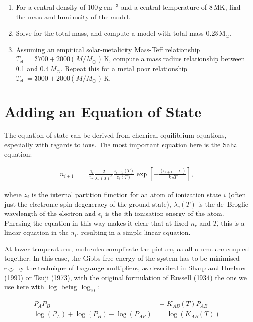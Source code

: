 \documentclass[12pt]{article}
\begin{document}
\begin{enumerate}
\item For a central density of 100\,g\,cm$^{-3}$ and a central temperature of 8\,MK, find the mass and luminosity of the model.

\item Solve for the total mass, and compute a model with total mass 0.28\,M$_\odot$.

\item Assuming an empirical solar-metalicity Mass-Teff relationship $T_\text{eff} = 2700 + 2000(M/M_\odot)$\,K, compute a mass radius relationship between 0.1 and 0.4\,$M_\odot$. Repeat this for a metal poor relationship $T_\text{eff} = 3000 + 2000(M/M_\odot)$\,K.
\end{enumerate}

\section{Adding an Equation of State}

The equation of state can be derived from chemical equilibrium equations, especially with regards to ions. The most important equation here is the Saha equation:

\begin{align}
n_{i+1} &= \frac{n_i}{n_e} \frac{2}{\lambda_e(T)^3} \frac{z_{i+1}(T)}{z_i(T)} \exp \left[ - \frac{(\epsilon_{i+1} - \epsilon_i)}{k_B T} \right],
\end{align}

where $z_i$ is the internal partition function for an atom of ionization state $i$ (often just the electronic spin degeneracy of the ground state), $\lambda_e(T)$ is the de~Broglie wavelength of the electron and $\epsilon_i$ is the $i$th ionisation energy of the atom. Phrasing the equation in this way makes it clear that at fixed $n_e$ and $T$, this is a linear equation in the $n_i$, resulting in a simple linear equation.

At lower temperatures, molecules complicate the picture, as all atoms are coupled together.  In this case, the Gibbs free energy of the system has to be minimised e.g. by the technique of Lagrange multipliers, as described in Sharp and Huebner (1990) or Tsuji (1973), with the original formulation of Russell (1934) the one we use here with $\log$ being $\log_{10}$:

\begin{align}
P_A P_B &= K_{AB}(T)P_{AB}\\
\log(P_A) + \log(P_B) - \log(P_{AB})&= \log(K_{AB}(T))
\end{align}
\end{document}
